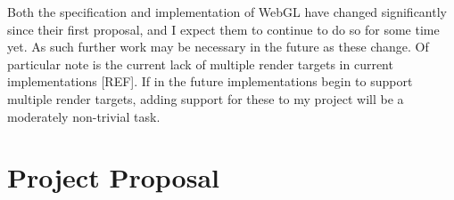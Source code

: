 \documentclass[12pt,twoside,notitlepage]{report}
\begin{document}
Both the specification and implementation of WebGL have changed significantly since their first proposal, and I expect them to continue to do so for some time yet. As such further work may be necessary in the future as these change. Of particular note is the current lack of multiple render targets in current implementations [REF]. If in the future implementations begin to support multiple render targets, adding support for these to my project will be a moderately non-trivial task.

\cleardoublepage



\cleardoublepage

\appendix












\cleardoublepage

\chapter{Project Proposal}


\end{document}
